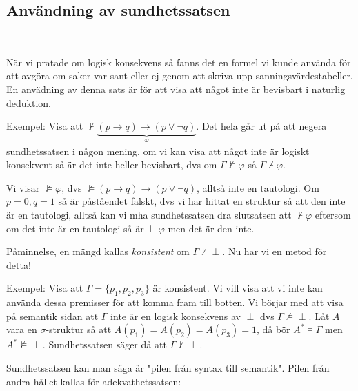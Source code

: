 \subsection{Användning av sundhetssatsen}\hfill\\
\par\bigskip
\noindent När vi pratade om logisk konsekvens så fanns det en formel vi kunde använda för att avgöra om saker var sant eller ej genom att skriva upp sanningsvärdestabeller. En anvädning av denna sats är för att visa att något inte är bevisbart i naturlig deduktion.
\par\bigskip
\noindent Exempel: Visa att $\nvdash\underbrace{(p\rightarrow q)\rightarrow(p\vee\neg q)}_{\text{$\varphi$}}$. Det hela går ut på att negera sundhetssatsen i någon mening, om vi kan visa att något inte är logiskt konsekvent så är det inte heller bevisbart, dvs om $\Gamma\nvDash\varphi$ så $\Gamma\nvdash\varphi$.\par
\noindent Vi visar $\nvDash\varphi$, dvs $\nvDash(p\rightarrow q)\rightarrow(p\vee\neg q)$, alltså inte en tautologi. Om $p=0, q = 1$ så är påståendet falskt, dvs vi har hittat en struktur så att den inte är en tautologi, alltså kan vi mha sundhetssatsen dra slutsatsen att $\nvdash\varphi$ eftersom om det inte är en tautologi så är $\vDash\varphi$ men det är den inte.
\par\bigskip
\noindent Påminnelse, en mängd kallas \textit{konsistent} om $\Gamma\nvdash\perp$. Nu har vi en metod för detta!
\par\bigskip
\noindent Exempel: Visa att $\Gamma = \{p_1,p_2,p_3\}$ är konsistent. Vi vill visa att vi inte kan använda dessa premisser för att komma fram till botten. Vi börjar med att visa på semantik sidan att $\Gamma$ inte är en logisk konsekvens av $\perp$ dvs $\Gamma\nvDash\perp$. Låt $A$ vara en $\sigma$-struktur så att $A(p_1)=A(p_2)=A(p_3)=1$, då bör $A^*\vDash\Gamma$ men $A^*\nvDash\perp$. Sundhetssatsen säger då att $\Gamma\nvdash\perp$.
\par\bigskip
\noindent Sundhetssatsen kan man säga är "pilen från syntax till semantik". Pilen från andra hållet kallas för adekvathetssatsen:
\par\bigskip


